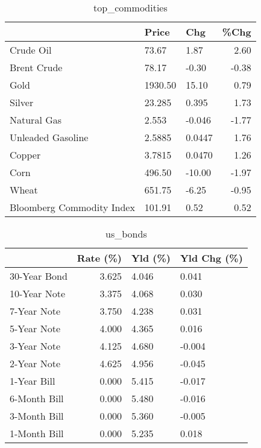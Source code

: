 \documentclass{article}%
\begin{document}
\begin{table}[htbp]%
\caption{top\_commodities}%
\centering%
\begin{adjustbox}{width=1\textwidth}%
\begin{tabular}{lllr}
\toprule
                          &   Price &    Chg &  \%Chg \\
\midrule
               Crude Oil  &   73.67 &   1.87 &  2.60 \\
             Brent Crude  &   78.17 &  -0.30 & -0.38 \\
                    Gold  & 1930.50 &  15.10 &  0.79 \\
                  Silver  &  23.285 &  0.395 &  1.73 \\
             Natural Gas  &   2.553 & -0.046 & -1.77 \\
       Unleaded Gasoline  &  2.5885 & 0.0447 &  1.76 \\
                  Copper  &  3.7815 & 0.0470 &  1.26 \\
                    Corn  &  496.50 & -10.00 & -1.97 \\
                   Wheat  &  651.75 &  -6.25 & -0.95 \\
Bloomberg Commodity Index &  101.91 &   0.52 &  0.52 \\
\bottomrule
\end{tabular}
%
\end{adjustbox}%
\end{table}

%


\begin{table}[htbp]%
\caption{us\_bonds}%
\centering%
\begin{adjustbox}{width=1\textwidth}%
\begin{tabular}{lrll}
\toprule
             &  Rate (\%) & Yld (\%) & Yld Chg (\%) \\
\midrule
30-Year Bond &     3.625 &   4.046 &       0.041 \\
10-Year Note &     3.375 &   4.068 &       0.030 \\
 7-Year Note &     3.750 &   4.238 &       0.031 \\
 5-Year Note &     4.000 &   4.365 &       0.016 \\
 3-Year Note &     4.125 &   4.680 &      -0.004 \\
 2-Year Note &     4.625 &   4.956 &      -0.045 \\
 1-Year Bill &     0.000 &   5.415 &      -0.017 \\
6-Month Bill &     0.000 &   5.480 &      -0.016 \\
3-Month Bill &     0.000 &   5.360 &      -0.005 \\
1-Month Bill &     0.000 &   5.235 &       0.018 \\
\bottomrule
\end{tabular}
%
\end{adjustbox}%
\end{table}
\end{document}
